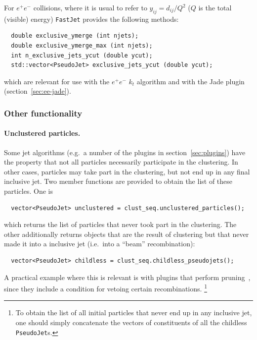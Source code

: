\documentclass[12pt,a4]{article}
\newcommand{\fastjet}{\texttt{FastJet}\xspace}
\newcommand{\ee}{e^+e^-}
\begin{document}
For $\ee$ collisions, where it is usual to refer to $y_{ij} =
d_{ij}/Q^2$ ($Q$ is the total (visible) energy) \fastjet provides the
following methods:
\begin{lstlisting}
  double exclusive_ymerge (int njets);
  double exclusive_ymerge_max (int njets);
  int n_exclusive_jets_ycut (double ycut);
  std::vector<PseudoJet> exclusive_jets_ycut (double ycut);
\end{lstlisting}
which are relevant for use with the $\ee$ $k_t$ algorithm and with the
Jade plugin (section~\ref{sec:ee-jade}).

\subsubsection{Other functionality}

\paragraph{Unclustered particles.}  
%
Some jet algorithms (e.g.\ a number of the plugins in
section~\ref{sec:plugins}) have the property that not all particles
necessarily participate in the clustering.
%
In other cases, particles may take part in the clustering, but not end
up in any final inclusive jet.
%
Two member functions are provided to obtain the list of these
particles.
%
One is
\begin{lstlisting}
  vector<PseudoJet> unclustered = clust_seq.unclustered_particles();
\end{lstlisting}
which returns the list of particles that never took part in the clustering.
%
The other additionally returns objects that are the result of
clustering but that never made it into a inclusive jet (i.e.\ into a
``beam'' recombination):
\begin{lstlisting}
  vector<PseudoJet> childless = clust_seq.childless_pseudojets();
\end{lstlisting}
A practical example where this is relevant is with plugins that
perform pruning~\cite{Ellis:2009su}, since they include a condition for
vetoing certain recombinations.%
\footnote{To obtain the list of all initial particles that never end up in any
  inclusive jet, one should simply concatenate the vectors of
  constituents of all the childless \texttt{PseudoJet}s.}
\end{document}
